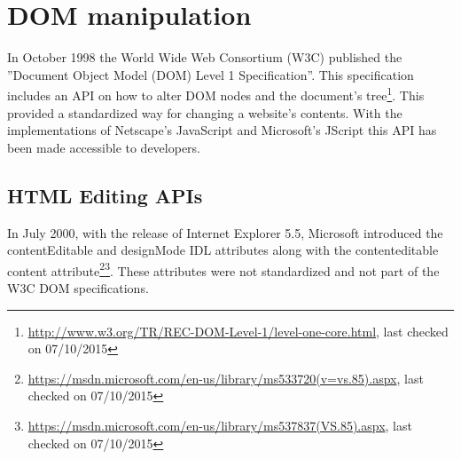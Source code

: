 \chapter{DOM manipulation}

In October 1998 the World Wide Web Consortium (W3C) published the ''Document Object Model (DOM) Level 1 Specification''. This specification includes an API on how to alter DOM nodes and the document's tree\footnote{\url{http://www.w3.org/TR/REC-DOM-Level-1/level-one-core.html}, last checked on 07/10/2015}. This provided a standardized way for changing a website's contents. With the implementations of Netscape's JavaScript and Microsoft's JScript this API has been made accessible to developers.

\section{HTML Editing APIs}

In July 2000, with the release of Internet Explorer 5.5, Microsoft introduced the contentEditable and designMode IDL attributes along with the contenteditable content attribute\footnote{\url{https://msdn.microsoft.com/en-us/library/ms533720(v=vs.85).aspx}, last checked on 07/10/2015}\footnote{\url{https://msdn.microsoft.com/en-us/library/ms537837(VS.85).aspx}, last checked on 07/10/2015}. These attributes were not standardized and not part of the W3C DOM specifications. 

\begin{table}[]
\centering
{}
\caption{Editing API attributes}
\label{editing-api-attributes}
\end{table}

